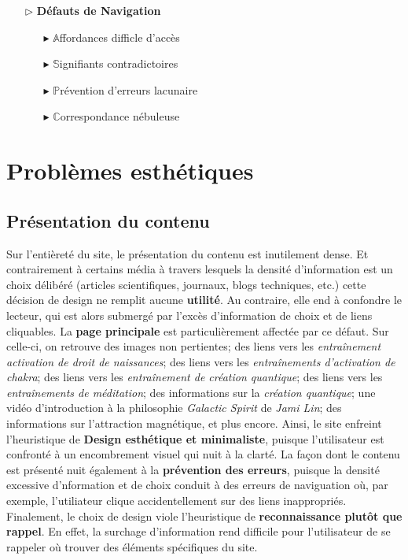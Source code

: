 \documentclass[9pt]{report}
\begin{document}
\begin{multicols*}{2}
    \begin{itemize}
    \item [$\rhd$ ] \textbf{Défauts de Navigation}  
      \begin{itemize}
        \item [$\blacktriangleright$ ] $\mathbb{A}$ffordances difficle d'accès 
        \item [$\blacktriangleright$ ] $\mathbb{S}$ignifiants contradictoires
        \item [$\blacktriangleright$ ] $\mathbb{P}$révention d'erreurs lacunaire
        \item [$\blacktriangleright$ ] $\mathbb{C}$orrespondance nébuleuse
      \end{itemize}
  \end{itemize}

  \section{Problèmes esthétiques}
  \subsection{Présentation du contenu}
  Sur l'entièreté du site, le présentation du contenu est 
  inutilement dense. Et contrairement à certains média 
  à travers lesquels la densité d'information est un choix délibéré 
  (articles scientifiques, journaux, blogs techniques, etc.) cette décision 
  de design ne remplit aucune \textbf{utilité}. Au contraire, elle 
  end à confondre le lecteur, qui est alors submergé par l'excès d'information 
  de choix et de liens cliquables. La \textbf{page principale} est particulièrement 
  affectée par ce défaut. Sur celle-ci, on retrouve des images 
  non pertientes; des liens vers les 
  \textit{entraînement activation de droit de naissances};  
  des liens vers les \textit{entraînements d'activation de chakra};
  des liens vers les \textit{entraînement de création quantique}; 
  des liens vers les \textit{entraînements de méditation}; des informations 
  sur la \textit{création quantique}; une vidéo d'introduction 
  à la philosophie \textit{Galactic Spirit} de \textit{Jami Lin}; 
  des informations sur l'attraction magnétique, et plus encore. 
  Ainsi, le site enfreint l'heuristique de 
  \textbf{Design esthétique et minimaliste}, puisque l'utilisateur 
  est confronté à un encombrement visuel qui nuit à la clarté. 
  La façon dont le contenu est présenté nuit également 
  à la \textbf{prévention des erreurs}, puisque la densité 
  excessive d'nformation et de choix conduit à des erreurs de naviguation 
  où, par exemple, l'utiliateur clique accidentellement sur des 
  liens inappropriés. Finalement, le choix de design viole l'heuristique de 
  \textbf{reconnaissance plutôt que rappel}. En effet, la surchage 
  d'information rend difficile pour l'utilisateur de se rappeler 
  où trouver des éléments spécifiques du site. 



\end{multicols*}
\end{document}
